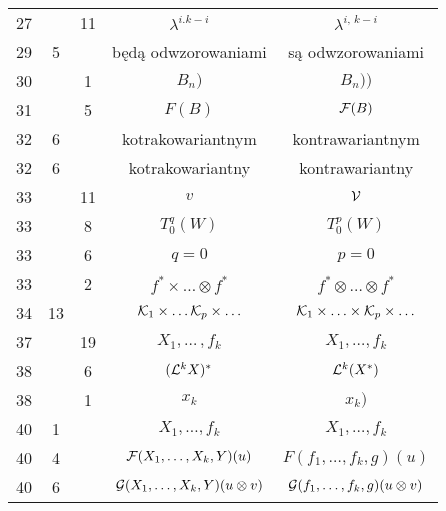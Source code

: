 \documentclass[a4paper,11pt]{article}
\begin{document}
\begin{center}
\begin{tabular}{|c|c|c|c|c|}
    27  & & 11 & $\lambda^{ i. k - i }$ & $\lambda^{ i,\, k - i }$ \\
    29  &  5 & & będą odwzorowaniami & są odwzorowaniami \\
    30  & &  1 & $B_{ n } )$ & $B_{ n } ) )$ \\
    31  & &  5 & $F( B )$ & $\mathcal{F}( B )$ \\
    32  &  6 & & kotrakowariantnym & kontrawariantnym \\
    32  &  6 & & kotrakowariantny & kontrawariantny \\
    33  & & 11 & $v$ & $\mathcal{V}$ \\
    33  & &  8 & $T_{ 0 }^{ q }( W )$ & $T_{ 0 }^{ p }( W )$ \\
    33  & &  6 & $q = 0$ & $p = 0$ \\
    33  & &  2 & $f^{ * } \times \ldots \otimes f^{ * }$
           & $f^{ * } \otimes \ldots \otimes f^{ * }$ \\
    34  & 13 & & $\mathcal{K}_{ 1 } \times \ldots \mathcal{K}_{ p } \times \ldots$
           & $\mathcal{K}_{ 1 } \times \ldots \times \mathcal{K}_{ p } \times \ldots$ \\
    37  & & 19 & $X_{ 1 }, \ldots\, , f_{ k }$ & $X_{ 1 }, \ldots, f_{ k }$ \\
    38  & &  6 & $( \mathcal{L}^{ k } X )^{ * }$ & $\mathcal{L}^{ k }( X^{ * } )$ \\
    38  & &  1 & $x_{ k }$ & $x_{ k } )$ \\
    40  &  1 & & $X_{ 1 }, \! \ldots, f_{ k }$
           & $X_{ 1 }, \ldots, f_{ k }$ \\
    40  &  4 & & $\mathcal{F}( X_{ 1 }, \ldots, X_{ k }, Y )( u )$
           & $F( f_{ 1 }, \ldots, f_{ k }, g )( u )$ \\
    40  &  6 & & $\mathcal{G}( X_{ 1 }, \ldots, X_{ k }, Y )( u \otimes v )$
           & $\mathcal{G}( f_{ 1 }, \ldots, f_{ k }, g )( u \otimes v )$ \\
    \hline
  \end{tabular}






\end{center}
\end{document}
